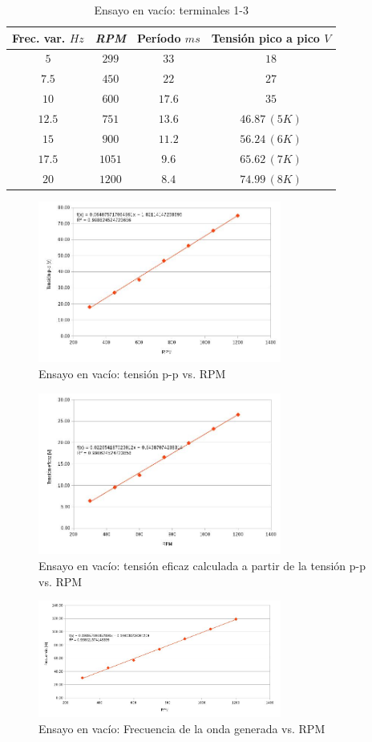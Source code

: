 \documentclass[a4paper,11pt,twoside]{IT-CNEA}
\begin{document}
\begin{table}[h!]
\centering
\caption{Ensayo en vacío: terminales 1-3}
\label{tabla:vacio}
\begin{tabular}{|c|c|c|c|}
\hline
Frec. var. $Hz$ & \textit{RPM} & Período $ms$ & Tensión pico a pico $V$\\ \hline

$5$&$299$&$33$&$18$ \\ \hline
$7.5$&$450$&$22$&$27$ \\ \hline
$10$&$600$&$17.6$&$35$ \\ \hline
$12.5$&$751$&$13.6$&$46.87\,(5K)$ \\ \hline
$15$&$900$&$11.2$&$56.24\,(6K)$ \\ \hline
$17.5$&$1051$&$9.6$&$65.62\,(7K)$ \\ \hline
$20$&$1200$&$8.4$&$74.99\,(8K)$ \\ \hline
\end{tabular}
\end{table}
\begin{figure}[h!]
\centering
\includegraphics[width=8cm]{Figuras/Vacio-TensionPP.jpg}
\caption{Ensayo en vacío: tensión p-p vs. RPM}
\label{fig:Vacio-TensionPP}
\end{figure}
\begin{figure}[h!]
\centering
\includegraphics[width=8cm]{Figuras/VacioTensionEf.jpg}
\caption{Ensayo en vacío: tensión eficaz calculada a partir de la tensión p-p vs. RPM}
\label{fig:VacioTensionEf}
\end{figure}
\begin{figure}[h!]
\centering
\includegraphics[width=8cm]{Figuras/VacioFrecuencia.jpg}
\caption{Ensayo en vacío: Frecuencia de la onda generada vs. RPM}
\label{fig:VacioFrecuencia}
\end{figure}
\end{document}
